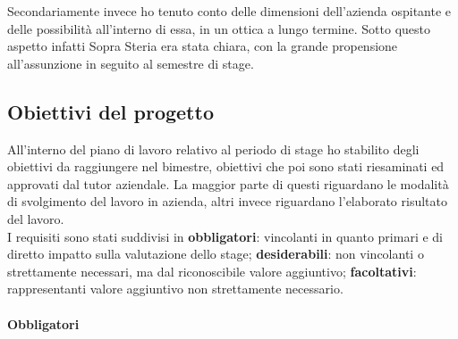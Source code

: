 Secondariamente invece ho tenuto conto delle dimensioni dell'azienda ospitante e delle possibilità all'interno di essa, in un ottica a lungo termine. Sotto questo aspetto infatti Sopra Steria era stata chiara, con la grande propensione all'assunzione in seguito al semestre di stage.

\subsection{Obiettivi del progetto}
All'interno del piano di lavoro relativo al periodo di stage ho stabilito degli obiettivi da raggiungere nel bimestre, obiettivi che poi sono stati riesaminati ed approvati dal tutor aziendale. La maggior parte di questi riguardano le modalità di svolgimento del lavoro in azienda, altri invece riguardano l'elaborato risultato del lavoro.\\

I requisiti sono stati suddivisi in \textbf{obbligatori}: vincolanti in quanto primari e di diretto impatto sulla valutazione dello stage; \textbf{desiderabili}: non vincolanti o strettamente necessari, ma dal riconoscibile valore aggiuntivo; \textbf{facoltativi}: rappresentanti valore aggiuntivo non strettamente necessario.

	\paragraph{Obbligatori}

